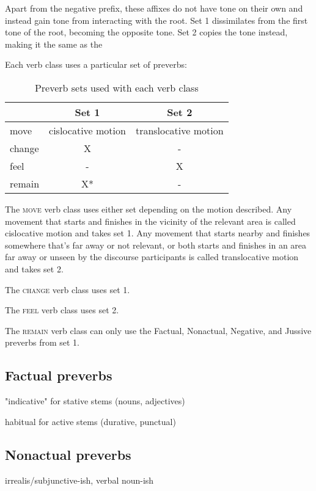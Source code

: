 \documentclass[smallroyalvopaper,9pt]{memoir} %
\begin{document}
Apart from the negative prefix, these affixes do not have tone on their own and instead gain tone from interacting with the root. Set 1 dissimilates from the first tone of the root, becoming the opposite tone. Set 2 copies the tone instead, making it the same as the 

Each verb class uses a particular set of preverbs:

\begin{table}[ht]
    \centering
    \begin{tabular}{>{\sc}lcc}
        \toprule
        & Set 1 & Set 2 \\
        \midrule
        move & cislocative motion & translocative motion \\
        change & X & - \\
        feel & - & X \\
        remain & X* & -\\
        \bottomrule
    \end{tabular}
    \caption{Preverb sets used with each verb class}
\end{table}

The \textsc{move} verb class uses either set depending on the motion described. Any movement that starts and finishes in the vicinity of the relevant area is called cislocative motion and takes set 1. Any movement that starts nearby and finishes somewhere that's far away or not relevant, or both starts and finishes in an area far away or unseen by the discourse participants is called translocative motion and takes set 2.

The \textsc{change} verb class uses set 1.

The \textsc{feel} verb class uses set 2.

The \textsc{remain} verb class can only use the Factual, Nonactual, Negative, and Jussive preverbs from set 1.

\subsection{Factual preverbs}

"indicative" for stative stems (nouns, adjectives)

habitual for active stems (durative, punctual)

\subsection{Nonactual preverbs}

irrealis/subjunctive-ish, verbal noun-ish
\end{document}

